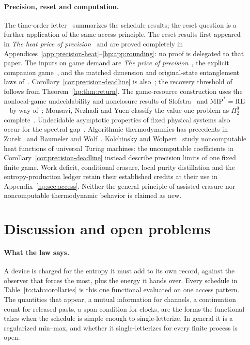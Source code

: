 \paragraph{Precision, reset and computation.} The time-order letter~\cite{Letter} summarizes the schedule results; the reset question is a further application of the same access principle. The reset results first appeared in \emph{The heat price of precision}~\cite{HPheat} and are proved completely in Appendices~\ref{app:precision-heat}--\ref{hp:app:rounding}: no proof is delegated to that paper. The inputs on game demand are \emph{The price of precision}~\cite{HPprecision}, the explicit companion game~\cite{HPexplicit}, and the matched dimension and original-state entanglement laws of~\cite[Theorem~1.1]{HPuncomputable}. Corollary~\ref{cor:precision-deadline} is also~\cite[Corollary~13.1]{HPuncomputable}; the recovery threshold of~\cite[Corollary~13.2]{HPuncomputable} follows from Theorem~\ref{hp:thm:return}. The game-resource construction uses the nonlocal-game undecidability and nonclosure results of Slofstra~\cite{Slofstra17} and $\mathrm{MIP}^*=\mathrm{RE}$~\cite{JNVWY20} by way of~\cite{HPuncomputable}; Mousavi, Nezhadi and Yuen classify the value-one problem as $\Pi^0_2$-complete~\cite{MNY21}. Undecidable asymptotic properties of fixed physical systems also occur for the spectral gap~\cite{CPGW15}. Algorithmic thermodynamics has precedents in Zurek~\cite{Zurek89} and Baumeler and Wolf~\cite{BW19}. Kolchinsky and Wolpert~\cite{HPKW20} study noncomputable heat functions of universal Turing machines; the uncomputable coefficients in Corollary~\ref{cor:precision-deadline} instead describe precision limits of one fixed finite game. Work deficit, conditional erasure, local purity distillation and the entropy-production ledger retain their established credits at their use in Appendix~\ref{hp:sec:access}. Neither the general principle of assisted erasure nor noncomputable thermodynamic behavior is claimed as new.

\section{Discussion and open problems}\label{sec:discussion}

\paragraph{What the law says.} A device is charged for the entropy it must add to its own record, against the observer that forces the most, plus the energy it hands over. Every schedule in Table~\ref{to:tab:corollaries} is this one functional evaluated on one access pattern. The quantities that appear, a mutual information for channels, a continuation count for released pasts, a span condition for clocks, are the forms the functional takes when the schedule is simple enough to single-letterize. In general it is a regularized min--max, and whether it single-letterizes for every finite process is open.

